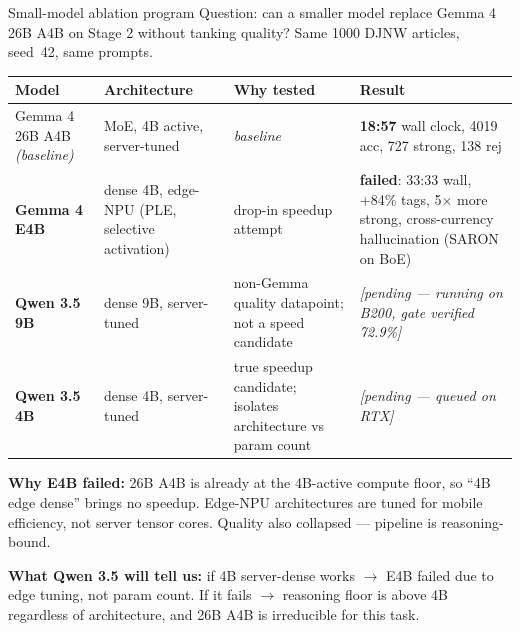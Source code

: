 \documentclass[10pt,aspectratio=169]{beamer}
\begin{document}
\begin{frame}{Small-model ablation program}
  \scriptsize
  Question: can a smaller model replace Gemma 4 26B A4B on Stage 2 without tanking quality?
  Same 1000 DJNW articles, seed~42, same prompts.

  \vspace{0.3em}
  \tiny
  \setlength{\tabcolsep}{3pt}
  \renewcommand{\arraystretch}{1.1}
  \begin{tabular}{p{}p{}p{}p{}}
    \toprule
    \textbf{Model} & \textbf{Architecture} & \textbf{Why tested} & \textbf{Result} \\
    \midrule
    Gemma 4 26B A4B \emph{(baseline)}
    & MoE, 4B active, server-tuned
    & \emph{baseline}
    & \textbf{18:57} wall clock, 4019 acc, 727 strong, 138 rej \\[0.15em]
    \textbf{Gemma 4 E4B}
    & dense 4B, edge-NPU (PLE, selective activation)
    & drop-in speedup attempt
    & \textcolor{red!70!black}{\textbf{failed}}: 33:33 wall, +84\% tags, 5$\times$ more strong,
      cross-currency hallucination (SARON on BoE) \\[0.15em]
    \textbf{Qwen 3.5 9B}
    & dense 9B, server-tuned
    & non-Gemma quality datapoint; not a speed candidate
    & \emph{[pending --- running on B200, gate verified 72.9\%]} \\[0.15em]
    \textbf{Qwen 3.5 4B}
    & dense 4B, server-tuned
    & true speedup candidate; isolates architecture vs param count
    & \emph{[pending --- queued on RTX]} \\
    \bottomrule
  \end{tabular}

  \vspace{0.4em}
  \scriptsize
  \raggedright
  \textbf{Why E4B failed:} 26B A4B is already at the 4B-active compute floor, so ``4B edge
  dense'' brings no speedup. Edge-NPU architectures are tuned for mobile efficiency, not
  server tensor cores. Quality also collapsed --- pipeline is reasoning-bound.

  \vspace{0.15em}
  \textbf{What Qwen 3.5 will tell us:} if 4B server-dense works $\rightarrow$ E4B failed due
  to edge tuning, not param count. If it fails $\rightarrow$ reasoning floor is above 4B
  regardless of architecture, and 26B A4B is irreducible for this task.
\end{frame}
\end{document}
